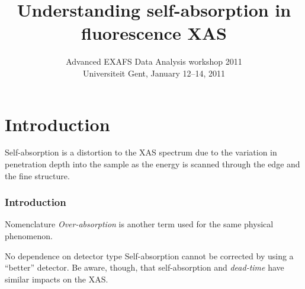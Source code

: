 \documentclass[10pt, xcolor=x11names, compress, handout]{beamer}
\title{Understanding self-absorption in fluorescence XAS}
\date[NSLS2010]{Advanced EXAFS Data Analysis workshop 2011\\
  Universiteit Gent, January 12--14, 2011}
\begin{document}
\maketitle


\section[Introduction]{Introduction}
\begin{frame}
  
  Self-absorption is a distortion to the XAS spectrum due to the
  variation in penetration depth into the sample as the energy is
  scanned through the edge and the fine structure.

  \frametitle{Introduction}
  \begin{block}{Nomenclature}
    \textit{Over-absorption} is another term used for the same physical
    phenomenon.
  \end{block}

  \begin{block}{No dependence on detector type}
    Self-absorption cannot be corrected by using a ``better''
    detector.  Be aware, though, that self-absorption and
    \textit{dead-time} have similar impacts on the XAS.
  \end{block}
\end{frame}
\end{document}
